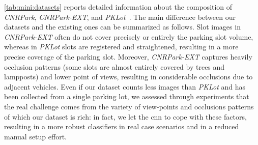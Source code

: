 \ref{tab:mini:datasets} reports detailed information about the composition of \emph{CNRPark}, \emph{CNRPark-EXT}, and \emph{PKLot}~\cite{de2015pklot}.
The main difference between our datasets and the existing ones can be summarized as follows.
Slot images in \emph{CNRPark-EXT} often do not cover precisely or entirely the parking slot volume, whereas in \emph{PKLot} slots are registered and straightened, resulting in a more precise coverage of the parking slot.
Moreover, \emph{CNRPark-EXT} captures heavily occlusion patterns (some slots are almost entirely covered by trees and lampposts) and lower point of views, resulting in considerable occlusions due to adjacent vehicles.
Even if our dataset counts less images than \emph{PKLot} and has been collected from a single parking lot, we assessed through experiments that the real challenge comes from the variety of view-points and occlusions patterns of which our dataset is rich:
in fact, we let the \gls{cnn} to cope with these factors, resulting in a more robust classifiers in real case scenarios and in a reduced manual setup effort.

